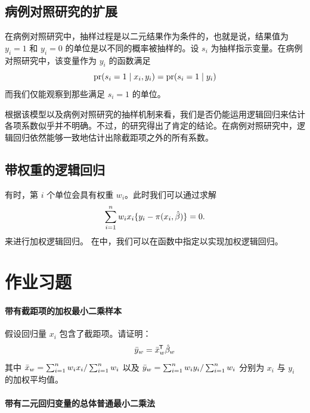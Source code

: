  

\subsection{病例对照研究的扩展}\label{sec::case-control}

在病例对照研究中，抽样过程是以二元结果作为条件的，也就是说，结果值为 $y_i=1$ 和 $y_i=0$ 的单位是以不同的概率被抽样的。设 $s_i$ 为抽样指示变量。在病例对照研究中，该变量作为 $y_i$ 的函数满足$$
\textup{pr}(s_i =1\mid x_i, y_i) = \textup{pr}(s_i =1\mid  y_i) 
$$而我们仅能观察到那些满足 $s_i = 1$ 的单位。 


根据该模型以及病例对照研究的抽样机制来看，我们是否仍能运用逻辑回归来估计各项系数似乎并不明确。不过，\citet{prentice1979logistic}的研究得出了肯定的结论。在病例对照研究中，逻辑回归依然能够一致地估计出除截距项之外的所有系数。




\subsection{带权重的逻辑回归}

有时，第 $i$ 个单位会具有权重 $w_i$。此时我们可以通过求解$$
\sum_{i=1}^n  w_i x_i  \{ y_i - \pi(x_{i}, \hat\beta)\} = 0.
$$来进行加权逻辑回归。  
在中，我们可以在函数中指定以实现加权逻辑回归。 







\section{作业习题}


 


\paragraph{带有截距项的加权最小二乘样本}\label{hw::sample-ols-intercept}

假设回归量 $x_i$ 包含了截距项。请证明：
\begin{equation}\label{eq::OLS-mean-data}
\bar{y}_w = \bar{x}_w^{\mkern-1.5mu\mathsf{T}} \hat{\beta}_w
\end{equation}
其中 $ \bar{x}_w =  \sum_{i=1}^n w_i  x_i / \sum_{i=1}^n w_i $ 以及 $ \bar{y}_w =  \sum_{i=1}^n w_i  y_i / \sum_{i=1}^n w_i $ 分别为 $x_i$ 与 $y_i$ 的加权平均值。 


\paragraph{带有二元回归变量的总体普通最小二乘法}\label{problem::pols-binary}


